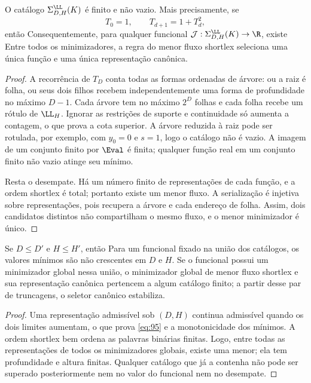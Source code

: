 \begin{teorema}
O catálogo $\Sigma^{\LL}_{D,H}(K)$ é finito e não vazio. Mais precisamente, se
\[
T_0=1,\qquad T_{d+1}=1+T_d^2,
\]
então
Consequentemente, para qualquer funcional $\mathcal J:\Sigma^{\LL}_{D,H}(K)\to\R$, existe
Entre todos os minimizadores, a regra do menor fluxo shortlex seleciona uma única função e uma única representação canônica.
\end{teorema}
\begin{proof}
A recorrência de $T_D$ conta todas as formas ordenadas de árvore: ou a raiz é folha, ou seus dois filhos recebem independentemente uma forma de profundidade no máximo $D-1$. Cada árvore tem no máximo $2^D$ folhas e cada folha recebe um rótulo de $\LL_H$. Ignorar as restrições de suporte e continuidade só aumenta a contagem, o que prova a cota superior. A árvore reduzida à raiz pode ser rotulada, por exemplo, com $y_0=0$ e $s=1$, logo o catálogo não é vazio. A imagem de um conjunto finito por $\Eval$ é finita; qualquer função real em um conjunto finito não vazio atinge seu mínimo.

Resta o desempate. Há um número finito de representações de cada função, e a ordem shortlex é total; portanto existe um menor fluxo. A serialização é injetiva sobre representações, pois recupera a árvore e cada endereço de folha. Assim, dois candidatos distintos não compartilham o mesmo fluxo, e o menor minimizador é único.
\end{proof}

\begin{proposicao}
Se $D\le D'$ e $H\le H'$, então
Para um funcional fixado na união dos catálogos, os valores mínimos são não crescentes em $D$ e $H$. Se o funcional possui um minimizador global nessa união, o minimizador global de menor fluxo shortlex e sua representação canônica pertencem a algum catálogo finito; a partir desse par de truncagens, o seletor canônico estabiliza.
\end{proposicao}
\begin{proof}
Uma representação admissível sob $(D,H)$ continua admissível quando os dois limites aumentam, o que prova \eqref{eq:95} e a monotonicidade dos mínimos. A ordem shortlex bem ordena as palavras binárias finitas. Logo, entre todas as representações de todos os minimizadores globais, existe uma menor; ela tem profundidade e altura finitas. Qualquer catálogo que já a contenha não pode ser superado posteriormente nem no valor do funcional nem no desempate.
\end{proof}

